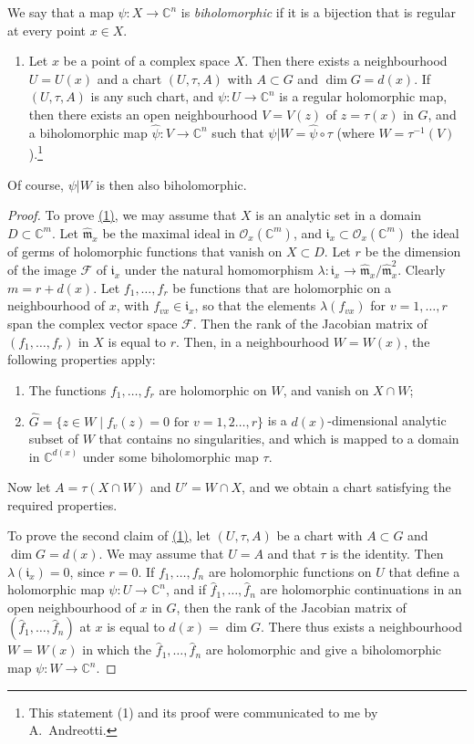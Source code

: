 \documentclass{article}
\theoremstyle{plain}
\theoremstyle{definition}
\newcommand{\scr}[1]{{\mathscr{#1}}}
\newcommand{\CC}{\mathbb{C}}
\newcommand{\fk}{\mathfrak}
\newcommand{\oldpage}[1]{\marginpar{\footnotesize$\Big\vert$ \textit{p.~#1}}}
\begin{document}
We say that a map $\psi\colon X\to\CC^n$ is \emph{biholomorphic} if it is a bijection that is regular at every point $x\in X$.

\begin{enumerate}[(1)]
  \itshape
  \item Let $x$ be a point of a complex space $X$.
    Then there exists a neighbourhood $U=U(x)$ and a chart $(U,\tau,A)$ with $A\subset G$ and $\dim G=d(x)$.
    If $(U,\tau,A)$ is any such chart, and $\psi\colon U\to\CC^n$ is a regular holomorphic map, then there exists an open neighbourhood $V=V(z)$ of $z=\tau(x)$ in $G$, and a biholomorphic map $\hat{\psi}\colon V\to\CC^n$ such that $\psi|W=\hat{\psi}\circ\tau$ (where $W=\tau^{-1}(V)$).\footnote{This statement (1) and its proof were communicated to me by A.~Andreotti.}
    \label{(1)}
\end{enumerate}

Of course, $\psi|W$ is then also biholomorphic.

\begin{proof}
To prove \hyperref[(1)]{(1)}, we may assume that $X$ is an analytic set in a domain $D\subset\CC^m$.
Let $\hat{\fk{m}}_x$ be the maximal ideal in $\scr{O}_x(\CC^m)$, and $\fk{i}_x\subset\scr{O}_x(\CC^m)$ the ideal of germs of holomorphic functions that vanish on $X\subset D$.
Let $r$ be the dimension of the image $\scr{F}$ of $\fk{i}_x$ under the natural homomorphism $\lambda\colon\fk{i}_x\to\hat{\fk{m}}_x/\hat{\fk{m}}_x^2$.
Clearly $m=r+d(x)$.
Let $f_1,\ldots,f_r$ be functions that are holomorphic on a neighbourhood of $x$, with $f_{vx}\in\fk{i}_x$, so that the elements $\lambda(f_{vx})$ for $v=1,\ldots,r$ span the complex vector space $\scr{F}$.
Then the rank of the Jacobian matrix of $(f_1,\ldots,f_r)$ in $X$ is equal to $r$.
Then, in a neighbourhood $W=W(x)$, the following properties apply:
\oldpage{334}
\begin{enumerate}[1)]
  \item The functions $f_1,\ldots,f_r$ are holomorphic on $W$, and vanish on $X\cap W$;
  \item $\hat{G}=\{z\in W\mid \mbox{$f_v(z)=0$ for $v=1,2\ldots,r$}\}$ is a $d(x)$-dimensional analytic subset of $W$ that contains no singularities, and which is mapped to a domain in $\CC^{d(x)}$ under some biholomorphic map $\tau$.
\end{enumerate}

Now let $A=\tau(X\cap W)$ and $U'=W\cap X$, and we obtain a chart satisfying the required properties.

To prove the second claim of \hyperref[(1)]{(1)}, let $(U,\tau,A)$ be a chart with $A\subset G$ and $\dim G=d(x)$.
We may assume that $U=A$ and that $\tau$ is the identity.
Then $\lambda(\fk{i}_x)=0$, since $r=0$.
If $f_1,\ldots,f_n$ are holomorphic functions on $U$ that define a holomorphic map $\psi\colon U\to\CC^n$, and if $\hat{f}_1,\ldots,\hat{f}_n$ are holomorphic continuations in an open neighbourhood of $x$ in $G$, then the rank of the Jacobian matrix of $(\hat{f}_1,\ldots,\hat{f}_n)$ at $x$ is equal to $d(x)=\dim G$.
There thus exists a neighbourhood $W=W(x)$ in which the $\hat{f}_1,\ldots,\hat{f}_n$ are holomorphic and give a biholomorphic map $\psi\colon W\to\CC^n$.
\end{proof}
\end{document}

